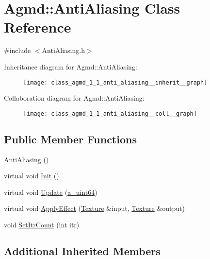 \hypertarget{class_agmd_1_1_anti_aliasing}{\section{Agmd\+:\+:Anti\+Aliasing Class Reference}
\label{class_agmd_1_1_anti_aliasing}
}


{\ttfamily \#include $<$Anti\+Aliasing.\+h$>$}



Inheritance diagram for Agmd\+:\+:Anti\+Aliasing\+:\nopagebreak
\begin{figure}[H]
\begin{center}
\leavevmode
\texttt{[image: class\_agmd\_1\_1\_anti\_aliasing\_\_inherit\_\_graph]}
\end{center}
\end{figure}


Collaboration diagram for Agmd\+:\+:Anti\+Aliasing\+:\nopagebreak
\begin{figure}[H]
\begin{center}
\leavevmode
\texttt{[image: class\_agmd\_1\_1\_anti\_aliasing\_\_coll\_\_graph]}
\end{center}
\end{figure}
\subsection*{Public Member Functions}
\begin{DoxyCompactItemize}
\item 
\hyperlink{class_agmd_1_1_anti_aliasing_a16e55675c0b4762eb92d09e94a2a25c2}{Anti\+Aliasing} ()
\item 
virtual void \hyperlink{class_agmd_1_1_anti_aliasing_a6e83a4740d7a8916b8652ef941a35403}{Init} ()
\item 
virtual void \hyperlink{class_agmd_1_1_anti_aliasing_a75119ac5199120cd1186b3a96fe18cbf}{Update} (\hyperlink{_common_defines_8h_a6c5192ec3c55d6e5b13d2dbaa082bdea}{a\+\_\+uint64})
\item 
virtual void \hyperlink{class_agmd_1_1_anti_aliasing_adb9b1c48992e92fac71727afcfae2edb}{Apply\+Effect} (\hyperlink{class_agmd_1_1_texture}{Texture} \&input, \hyperlink{class_agmd_1_1_texture}{Texture} \&output)
\item 
void \hyperlink{class_agmd_1_1_anti_aliasing_ae6f5958587990dfdc6420106c50b25f5}{Set\+Itr\+Count} (int itr)
\end{DoxyCompactItemize}
\subsection*{Additional Inherited Members}


